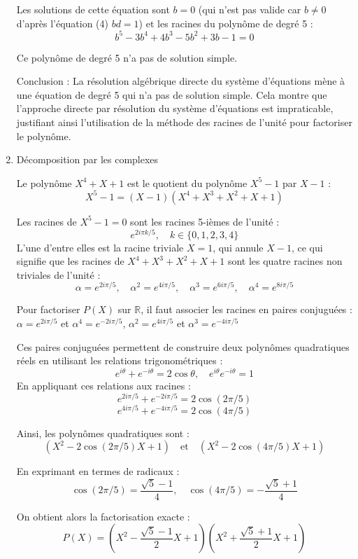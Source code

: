 \documentclass[10pt,a4paper]{article}
\begin{document}
\begin{enumerate}
   Les solutions de cette équation sont $b = 0$ (qui n'est pas valide car $b \neq 0$ d'après
   l'équation (4) $bd = 1$) et les racines du polynôme de degré 5 :
      $$b^5 - 3b^4 + 4b^3 - 5b^2 + 3b - 1 = 0$$

   Ce polynôme de degré 5 n'a pas de solution simple.

   Conclusion : La résolution algébrique directe du système d'équations mène à une équation de degré
   5 qui n'a pas de solution simple. Cela montre que l'approche directe par résolution du système
   d'équations est impraticable, justifiant ainsi l'utilisation de la méthode des racines de l'unité
   pour factoriser le polynôme.

    \item Décomposition par les complexes

    Le polynôme $X^4 + X + 1$ est le quotient du polynôme $X^5 - 1$ par $X - 1$ :
    $$X^5 - 1 = (X - 1)(X^4 + X^3 + X^2 + X + 1)$$

    Les racines de $X^5 - 1 = 0$ sont les racines 5-ièmes de l'unité :
    $$e^{2i\pi k/5}, \quad k \in \{0,1,2,3,4\}$$ L'une d'entre elles est la racine triviale $X = 1$,
    qui annule $X - 1$, ce qui signifie que les racines de $X^4 + X^3 + X^2 + X + 1$ sont les quatre
    racines non triviales de l'unité :
    $$\alpha = e^{2i\pi/5}, \quad \alpha^2 = e^{4i\pi/5}, \quad \alpha^3 = e^{6i\pi/5}, \quad
    \alpha^4 = e^{8i\pi/5}$$

    Pour factoriser $P(X)$ sur $\mathbb{R}$, il faut associer les racines en paires conjuguées :
    $\alpha = e^{2i\pi/5}$ et $\alpha^4 = e^{-2i\pi/5}$, $\alpha^2 = e^{4i\pi/5}$ et $\alpha^3 =
    e^{-4i\pi/5}$

    Ces paires conjuguées permettent de construire deux polynômes quadratiques réels en utilisant
    les relations trigonométriques :
    $$e^{i\theta} + e^{-i\theta} = 2\cos\theta, \quad e^{i\theta} e^{-i\theta} = 1$$ En appliquant
    ces relations aux racines :
    $$e^{2i\pi/5} + e^{-2i\pi/5} = 2\cos(2\pi/5)$$
    $$e^{4i\pi/5} + e^{-4i\pi/5} = 2\cos(4\pi/5)$$

    Ainsi, les polynômes quadratiques sont :
    $$(X^2 - 2\cos(2\pi/5) X + 1) \quad \text{et} \quad (X^2 - 2\cos(4\pi/5) X + 1)$$

    En exprimant en termes de radicaux :
    $$\cos(2\pi/5) = \frac{\sqrt{5} - 1}{4}, \quad \cos(4\pi/5) = -\frac{\sqrt{5} + 1}{4}$$

    On obtient alors la factorisation exacte :
    $$P(X) = \left(X^2 - \frac{\sqrt{5} - 1}{2} X + 1\right) \left(X^2 + \frac{\sqrt{5} + 1}{2} X +
    1\right)$$


\end{enumerate}
\end{document}
